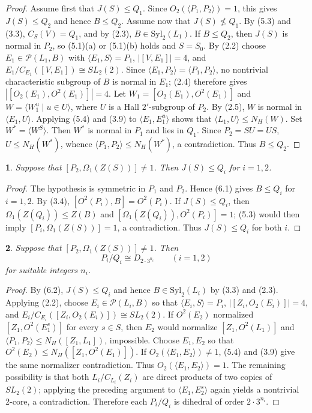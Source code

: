 \documentclass[11pt]{article}
\theoremstyle{plain}
\theoremstyle{stmplain}
\newtheorem{stm}{}[section]
\begin{document}
\begin{proof}
Assume first that $J(S)\le Q_1$. Since
$O_2(\langle P_1,P_2\rangle)=1$, this gives $J(S)\le Q_2$ and hence
$B\le Q_2$. Assume now that $J(S)\nleq Q_1$. By (5.3) and (3.3),
$C_S(V)=Q_1$, and by (2.3), $B\in\mathrm{Syl}_2(L_1)$. If
$B\le Q_2$, then $J(S)$ is normal in $P_2$, so (5.1)(a) or (5.1)(b)
holds and $S=S_0$. By (2.2) choose $E_1\in\mathcal P(L_1,B)$ with
$\langle E_1,S\rangle=P_1$, $|[V,E_1]|=4$, and
$E_1/C_{E_1}([V,E_1])\cong SL_2(2)$. Since
$\langle E_1,P_2\rangle=\langle P_1,P_2\rangle$, no nontrivial
characteristic subgroup of $B$ is normal in $E_1$; (2.4) therefore gives
$|[O_2(E_1),O^2(E_1)]|=4$. Let
$W_1=[O_2(E_1),O^2(E_1)]$ and
$W=\langle W_1^u\mid u\in U\rangle$, where $U$ is a Hall $2'$-subgroup
of $P_2$. By (2.5), $W$ is normal in $\langle E_1,U\rangle$.
Applying (5.4) and (3.9) to $\langle E_1,E_1^u\rangle$ shows that
$\langle L_1,U\rangle\le N_H(W)$. Set $W^*=\langle W^S\rangle$.
Then $W^*$ is normal in $P_1$ and lies in $Q_1$. Since $P_2=SU=US$,
$U\le N_H(W^*)$, whence
$\langle P_1,P_2\rangle\le N_H(W^*)$, a contradiction.
Thus $B\le Q_2$.
\end{proof}

\begin{stm}\label{st:6.2}
Suppose that $[P_2,\Omega_1(Z(S))]\ne1$. Then $J(S)\le Q_i$ for
$i=1,2$.
\end{stm}

\begin{proof}
The hypothesis is symmetric in $P_1$ and $P_2$. Hence (6.1) gives
$B\le Q_i$ for $i=1,2$. By (3.4),
$[O^2(P_i),B]=O^2(P_i)$. If $J(S)\le Q_i$, then
$\Omega_1(Z(Q_i))\le Z(B)$ and
$[\Omega_1(Z(Q_i)),O^2(P_i)]=1$; (5.3) would then imply
$[P_i,\Omega_1(Z(S))]=1$, a contradiction. Thus $J(S)\le Q_i$ for both
$i$.
\end{proof}

\begin{stm}\label{st:6.3}
Suppose that $[P_2,\Omega_1(Z(S))]\ne1$. Then
\[
  P_i/Q_i\cong D_{2\cdot 3^{n_i}}
  \qquad (i=1,2)
\]
for suitable integers $n_i$.
\end{stm}

\begin{proof}
By (6.2), $J(S)\le Q_i$ and hence $B\in\mathrm{Syl}_2(L_i)$ by
(3.3) and (2.3). Applying (2.2), choose $E_i\in\mathcal P(L_i,B)$ so that
$\langle E_i,S\rangle=P_i$, $|[Z_i,O_2(E_i)]|=4$, and
$E_i/C_{E_i}([Z_i,O_2(E_i)])\cong SL_2(2)$. If $O^2(E_2)$ normalized
$[Z_1,O^2(E_1^s)]$ for every $s\in S$, then $E_2$ would normalize
$[Z_1,O^2(L_1)]$ and $\langle P_1,P_2\rangle\le N_H([Z_1,L_1])$,
impossible. Choose $E_1,E_2$ so that
$O^2(E_2)\le N_H([Z_1,O^2(E_1)])$. If
$O_2(\langle E_1,E_2\rangle)\ne1$, (5.4) and (3.9) give the same
normalizer contradiction. Thus $O_2(\langle E_1,E_2\rangle)=1$.
The remaining possibility is that both $L_i/C_{L_i}(Z_i)$ are direct
products of two copies of $SL_2(2)$; applying the preceding argument to
$\langle E_1,E_2^s\rangle$ again yields a nontrivial 2-core, a contradiction.
Therefore each $P_i/Q_i$ is dihedral of order $2\cdot3^{n_i}$.
\end{proof}
\end{document}
